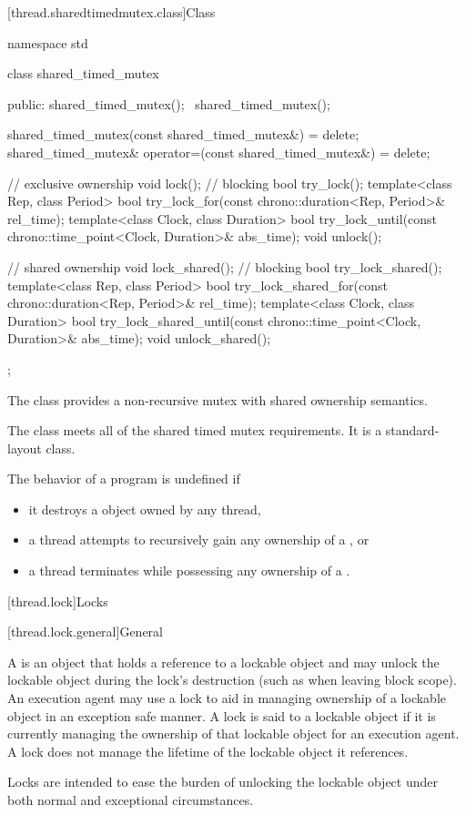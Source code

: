 [thread.sharedtimedmutex.class]{Class }

%
\begin{codeblock}
namespace std {
  class shared_timed_mutex {
  public:
    shared_timed_mutex();
    ~shared_timed_mutex();

    shared_timed_mutex(const shared_timed_mutex&) = delete;
    shared_timed_mutex& operator=(const shared_timed_mutex&) = delete;

    // exclusive ownership
    void lock();                // blocking
    bool try_lock();
    template<class Rep, class Period>
      bool try_lock_for(const chrono::duration<Rep, Period>& rel_time);
    template<class Clock, class Duration>
      bool try_lock_until(const chrono::time_point<Clock, Duration>& abs_time);
    void unlock();

    // shared ownership
    void lock_shared();         // blocking
    bool try_lock_shared();
    template<class Rep, class Period>
      bool try_lock_shared_for(const chrono::duration<Rep, Period>& rel_time);
    template<class Clock, class Duration>
      bool try_lock_shared_until(const chrono::time_point<Clock, Duration>& abs_time);
    void unlock_shared();
  };
}
\end{codeblock}

\pnum
The class  provides a non-recursive mutex with shared
ownership semantics.

\pnum
The class  meets
all of the shared timed mutex requirements.
It is a standard-layout class.

\pnum
The behavior of a program is undefined if
\begin{itemize}
\item it destroys a  object owned by any thread,
\item a thread attempts to recursively gain any ownership of a , or
\item a thread terminates while possessing any ownership of a .
\end{itemize}

[thread.lock]{Locks}

[thread.lock.general]{General}

\pnum
A  is an object that holds a reference to a lockable object and may unlock the
lockable object during the lock's destruction (such as when leaving block scope). An execution
agent may use a lock to aid in managing ownership of a lockable object in an exception safe
manner. A lock is said to  a lockable object if it is currently managing the
ownership of that lockable object for an execution agent. A lock does not manage the lifetime
of the lockable object it references.
\begin{note}
Locks are intended to ease the burden of
unlocking the lockable object under both normal and exceptional circumstances.
\end{note}

